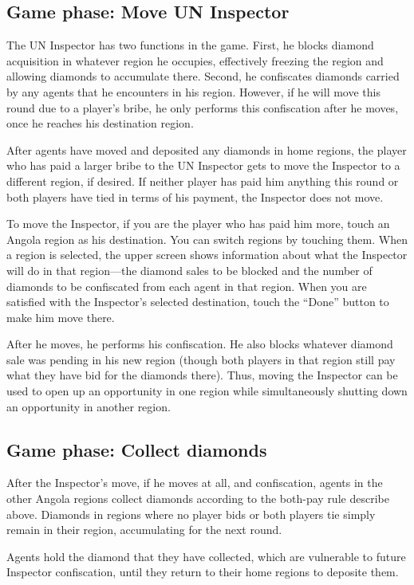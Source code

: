 \documentclass[8pt]{extbook}
\begin{document}
\subsection{Game phase:  Move UN Inspector}

The UN Inspector has two functions in the game.  First, he blocks diamond acquisition in whatever region he occupies, effectively freezing the region and allowing diamonds to accumulate there.  Second, he confiscates diamonds carried by any agents that he encounters in his region.  However, if he will move this round due to a player's bribe, he only performs this confiscation after he moves, once he reaches his destination region.

After agents have moved and deposited any diamonds in home regions, the player who has paid a larger bribe to the UN Inspector gets to move the Inspector to a different region, if desired.  If neither player has paid him anything this round or both players have tied in terms of his payment, the Inspector does not move.

To move the Inspector, if you are the player who has paid him more, touch an Angola region as his destination.  You can switch regions by touching them.  When a region is selected, the upper screen shows information about what the Inspector will do in that region---the diamond sales to be blocked and the number of diamonds to be confiscated from each agent in that region.  When you are satisfied with the Inspector's selected destination, touch the ``Done'' button to make him move there.

After he moves, he performs his confiscation.  He also blocks whatever diamond sale was pending in his new region (though both players in that region still pay what they have bid for the diamonds there).  Thus, moving the Inspector can be used to open up an opportunity in one region while simultaneously shutting down an opportunity in another region.

\subsection{Game phase:  Collect diamonds}

After the Inspector's move, if he moves at all, and confiscation, agents in the other Angola regions collect diamonds according to the both-pay rule describe above.  Diamonds in regions where no player bids or both players tie simply remain in their region, accumulating for the next round.

Agents hold the diamond that they have collected, which are vulnerable to future Inspector confiscation, until they return to their home regions to deposite them.
\end{document}
